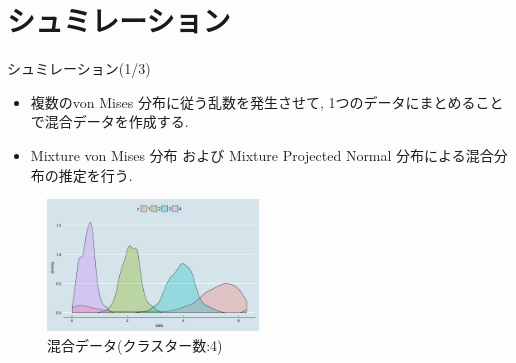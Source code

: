 \documentclass[dvipdfmx]{beamer}
\begin{document}
\section{シュミレーション}
\begin{frame}{シュミレーション(1/3)}

\begin{itemize}
\item
複数のvon Mises 分布に従う乱数を発生させて, 1つのデータにまとめることで混合データを作成する.

\item
Mixture von Mises 分布 および Mixture Projected Normal 分布による混合分布の推定を行う.
\end{itemize}

\vspace{-0.3cm}
\begin{figure}[H]
\begin{center}
\includegraphics[clip,height= 35mm]{data/mix_test_data.png}
\end{center}
\caption{混合データ(クラスター数:4)}
\label{mixdata}
\end{figure}

\end{frame}
\end{document}

